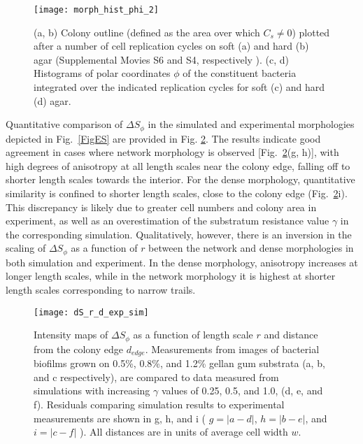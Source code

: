 \documentclass[aps,prl,numerical,reprint,superscriptaddress,showpacs]{revtex4-1}
\begin{document}
\begin{figure}[h]
\centering
{\texttt{[image: morph\_hist\_phi\_2]}}
\caption{(a, b) Colony outline (defined as the area over which $C_s \neq 0$) plotted after a number of cell replication cycles on soft (a) and hard (b) agar (Supplemental Movies S6 and S4, respectively \cite{Supp}). (c, d) Histograms of polar coordinates $\phi$ of the constituent bacteria integrated over the indicated replication cycles for soft (c) and hard (d) agar.}
\label{Fig2}
\end{figure}

Quantitative comparison of $\Delta S_{\phi}$ in the simulated and experimental morphologies depicted in Fig.~\ref{FigES} are provided in Fig. \ref{dS_exp_sim}. The results indicate good agreement in cases where network morphology is observed [Fig.~\ref{dS_exp_sim}(g, h)], with high degrees of anisotropy at all length scales near the colony edge, falling off to shorter length scales towards the interior. For the dense morphology, quantitative similarity is confined to shorter length scales, close to the colony edge (Fig.~\ref{dS_exp_sim}i). This discrepancy is likely due to greater cell numbers and colony area in experiment, as well as an overestimation of the substratum resistance value $\gamma$ in the corresponding simulation. Qualitatively, however, there is an inversion in the scaling of $\Delta S_{\phi}$ as a function of $r$ between the network and dense morphologies in both simulation and experiment. In the dense morphology, anisotropy increases at longer length scales, while in the network morphology it is highest at shorter length scales corresponding to narrow trails. 


\begin{figure}
\centering
{\texttt{[image: dS\_r\_d\_exp\_sim]}}
\caption{Intensity maps of $\Delta S_{\phi}$ as a function of length scale $r$ and distance from the colony edge $d_{edge}$. Measurements from images of bacterial biofilms grown on 0.5\%, 0.8\%, and 1.2\%  gellan gum substrata (a, b, and c respectively), are compared to data measured from simulations with increasing $\gamma$ values of 0.25, 0.5, and 1.0, (d, e, and f). Residuals comparing simulation results to experimental measurements are shown in g, h, and i ( $g = |a-d|$, $h = |b-e|$, and $i = |c - f|$ ). All distances are in units of average cell width $w$.}
\label{dS_exp_sim}
\end{figure}
\end{document}
